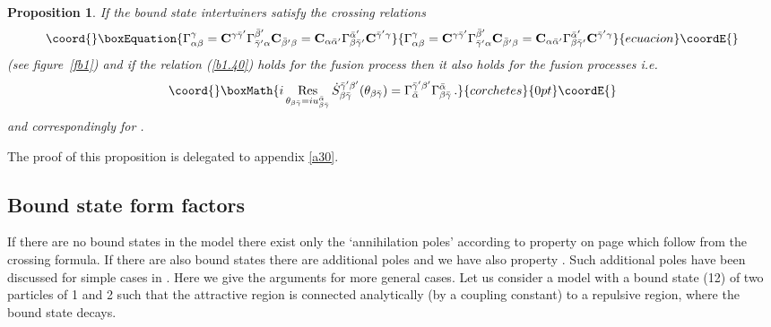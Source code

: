 \documentclass[a4paper,a4paper]{article}
\newtheorem{proposition}[theorem]{Proposition}
\begin{document}
\begin{proposition}
\label{pb1}If the bound state intertwiners satisfy the crossing relations 
\begin{equation}\coord{}\boxEquation{
\Gamma _{\alpha \beta }^{\gamma }=\mathbf{C}^{\gamma \bar{\gamma}^{\prime
}}\Gamma _{\bar{\gamma}^{\prime }\alpha }^{\bar{\beta}^{\prime }}\mathbf{C}_{
\bar{\beta}^{\prime }\beta }=\mathbf{C}_{\alpha \bar{\alpha}^{\prime
}}\Gamma _{\beta \bar{\gamma}^{\prime }}^{\bar{\alpha}^{\prime }}\mathbf{C}^{
\bar{\gamma}^{\prime }\gamma }  \label{b1.70}
}{
\Gamma _{\alpha \beta }^{\gamma }=\mathbf{C}^{\gamma \bar{\gamma}^{\prime
}}\Gamma _{\bar{\gamma}^{\prime }\alpha }^{\bar{\beta}^{\prime }}\mathbf{C}_{
\bar{\beta}^{\prime }\beta }=\mathbf{C}_{\alpha \bar{\alpha}^{\prime
}}\Gamma _{\beta \bar{\gamma}^{\prime }}^{\bar{\alpha}^{\prime }}\mathbf{C}^{
\bar{\gamma}^{\prime }\gamma }  }{ecuacion}\coordE{}\end{equation}
(see figure~\ref{fb1}) and if the relation (\ref{b1.40}) holds for the
fusion process \myHighlight{$\alpha +\beta \rightarrow \gamma $}\coordHE{} then it also holds for
the fusion processes \myHighlight{$\beta +\bar{\gamma}\rightarrow \bar{\alpha}$}\coordHE{} i.e. 
\[\coord{}\boxMath{
i\mathop{\rm Res}_{\theta _{\beta \bar{\gamma}}=iu_{\beta \bar{\gamma}}^{%
\bar{\alpha}}}\dot{S}_{\beta \bar{\gamma}}^{\bar{\gamma}^{\prime }\beta
^{\prime }}(\theta _{\beta \bar{\gamma}})=\Gamma _{\bar{\alpha}}^{\bar{\gamma%
}^{\prime }\beta ^{\prime }}\Gamma _{\beta \bar{\gamma}}^{\bar{\alpha}}\,. 
}{corchetes}{0pt}\coordE{}\]
and correspondingly for \myHighlight{$\bar{\gamma}+\alpha \rightarrow \bar{\beta}$}\coordHE{}.
\end{proposition}

The proof of this proposition is delegated to appendix \ref{a30}.

\subsection{Bound state form factors}

If there are no bound states in the model there exist only the `annihilation
poles' according to property \coordHE{} on page \pageref{p} which follow from
the crossing formula. If there are also bound states there are additional
poles \cite{KW} and we have also property \coordHE{}. Such additional poles have
been discussed for simple cases in \cite{KW,BFKZ}. Here we give the
arguments for more general cases. Let us consider a model with a bound state
(12) of two particles of 1 and 2 such that the attractive region is
connected analytically (by a coupling constant) to a repulsive region, where
the bound state decays.
\end{document}
